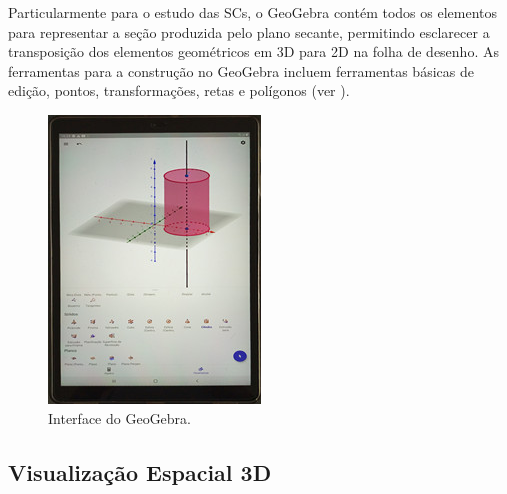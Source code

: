 Particularmente para o estudo das SCs, o GeoGebra contém todos os
elementos para representar a seção produzida pelo plano secante,
permitindo esclarecer a transposição dos elementos geométricos em 3D
para 2D na folha de desenho. As ferramentas para a construção no
GeoGebra incluem ferramentas básicas de edição, pontos, transformações,
retas e polígonos (ver ).

\begin{figure}[htpb]
\centering
\begin{minipage}{.4\textwidth}
\includegraphics[width=\textwidth]{figures/figure02.jpg}
\caption{Interface do GeoGebra.}
\label{fig-02}
\end{minipage}
\end{figure}

\subsection{Visualização Espacial 3D}\label{sub-sec-Visualização Espacial 3D}

